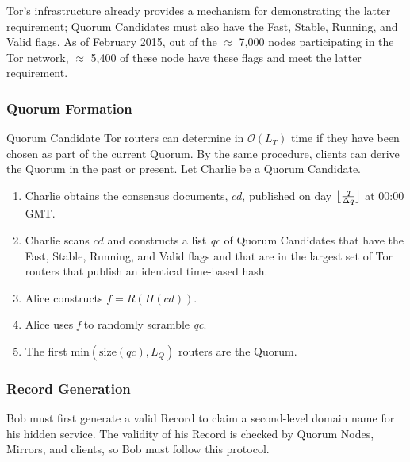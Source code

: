 \documentclass{sig-alternate}
\DeclarePairedDelimiter{\floor}{\lfloor}{\rfloor}
\begin{document}
Tor's infrastructure already provides a mechanism for demonstrating the latter requirement; Quorum Candidates must also have the Fast, Stable, Running, and Valid flags. As of February 2015, out of the $ \approx $ 7,000 nodes participating in the Tor network, $ \approx $ 5,400 of these node have these flags and meet the latter requirement.\cite{TorMetrics}

\subsubsection{Quorum Formation}

Quorum Candidate Tor routers can determine in  $ \mathcal{O}(L_{T}) $ time if they have been chosen as part of the current Quorum. By the same procedure, clients can derive the Quorum in the past or present. Let Charlie be a Quorum Candidate.

\begin{enumerate}
	\item Charlie obtains the consensus documents, $ cd $, published on day $ \floor[\big]{\frac{q}{\Delta q}} $ at 00:00 GMT.
	\item Charlie scans $ cd $ and constructs a list \emph{qc} of Quorum Candidates that have the Fast, Stable, Running, and Valid flags and that are in the largest set of Tor routers that publish an identical time-based hash. 
	\item Alice constructs $ f = \mathit{R}(H(\mathit{cd})) $.
	\item Alice uses \emph{f} to randomly scramble \emph{qc}.
	\item The first $ \mathrm{min}(\mathrm{size}(\mathit{qc}), L_{Q}) $ routers are the Quorum.
\end{enumerate}

\subsubsection{Record Generation}

Bob must first generate a valid Record to claim a second-level domain name for his hidden service. The validity of his Record is checked by Quorum Nodes, Mirrors, and clients, so Bob must follow this protocol.
\end{document}
